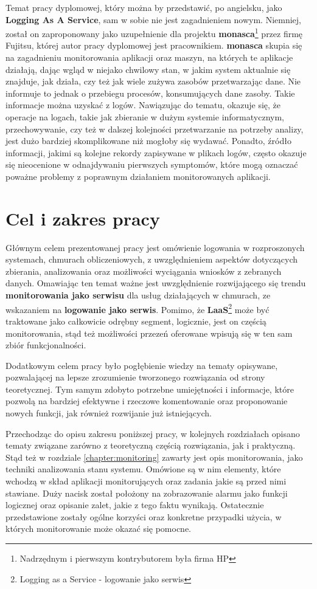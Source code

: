 Temat pracy dyplomowej, który można by przedstawić, po angielsku, jako \textbf{Logging As A Service}, sam w sobie nie jest zagadnieniem
nowym. Niemniej, został on zaproponowany jako uzupełnienie dla projektu \textbf{monasca}\footnote{Nadrzędnym i pierwszym kontrybutorem była firma HP} przez
firmę Fujitsu, której autor pracy dyplomowej jest pracownikiem. 
\textbf{monasca} skupia się na zagadnieniu monitorowania aplikacji oraz maszyn, na których te aplikacje działają, dając wgląd w niejako
chwilowy stan, w jakim system aktualnie się znajduje, jak działa, czy też jak wiele zużywa zasobów przetwarzając dane. Nie informuje to jednak o 
przebiegu procesów, konsumujących dane zasoby. Takie informacje można uzyskać z logów. Nawiązując do tematu, okazuje się, że operacje na logach, takie jak 
zbieranie w dużym systemie informatycznym, przechowywanie, czy też w dalszej kolejności przetwarzanie na potrzeby analizy, jest dużo bardziej 
skomplikowane niż mogłoby się wydawać. Ponadto, źródło informacji, jakimi są kolejne rekordy zapisywane w plikach logów, często okazuje się nieocenione w 
odnajdywaniu pierwszych symptomów, które mogą oznaczać poważne problemy z poprawnym działaniem monitorowanych aplikacji.

\section{Cel i zakres pracy}

Głównym celem prezentowanej pracy jest omówienie logowania w rozproszonych systemach, chmurach obliczeniowych, 
z uwzględnieniem aspektów dotyczących zbierania, analizowania oraz możliwości wyciągania wniosków z zebranych danych.
Omawiając ten temat ważne jest uwzględnienie rozwijającego się trendu \textbf{monitorowania jako serwisu} dla usług 
działających w chmurach, ze wskazaniem na \textbf{logowanie jako serwis}. Pomimo, że \textbf{LaaS}\footnote{Logging as a 
Service - logowanie jako serwis} może być traktowane jako całkowicie odrębny segment, logicznie, jest on częścią 
monitorowania, stąd też możliwości przezeń oferowane wpisują się w ten sam zbiór funkcjonalności. 

Dodatkowym celem pracy było pogłębienie wiedzy na tematy opisywane, pozwalającej na lepsze zrozumienie tworzonego rozwiązania od strony teoretycznej. Tym samym zdobyto
potrzebne umiejętności i informacje, które pozwolą na bardziej efektywne i rzeczowe komentowanie oraz proponowanie nowych funkcji, jak również rozwijanie już istniejących.  

Przechodząc do opisu zakresu poniższej pracy, w kolejnych rozdziałach opisano tematy związane zarówno z teoretyczną częścią rozwiązania, 
jak i praktyczną. Stąd też w rozdziale \ref{chapter:monitoring} zawarty jest opis monitorowania, jako techniki
analizowania stanu systemu. Omówione są w nim elementy, które wchodzą w skład aplikacji
monitorujących oraz zadania jakie są przed nimi stawiane. Duży nacisk został położony
na zobrazowanie alarmu jako funkcji logicznej oraz opisanie zalet, jakie z tego faktu
wynikają. Ostatecznie przedstawione zostały ogólne korzyści oraz konkretne przypadki użycia,
w których monitorowanie może okazać się pomocne.

